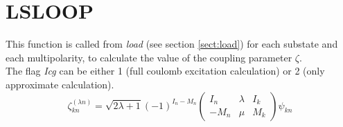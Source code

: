\section{LSLOOP}
\label{sect:lsloop}

\noindent This function is called from {\em load} (see section
\ref{sect:load}) for each substate and each multipolarity, to calculate the
value of the coupling parameter $\zeta$.\\

\noindent The flag {\em Icg} can be either 1 (full coulomb excitation
calculation) or 2 (only approximate calculation).\\

\begin{equation}
\zeta_{kn}^{(\lambda n)} =
\sqrt{2 \lambda + 1}
(-1)^{I_n - M_n}
\begin{pmatrix}
I_n & \lambda & I_k\\
-M_n & \mu & M_k
\end{pmatrix}
\psi_{kn}
\end{equation}
